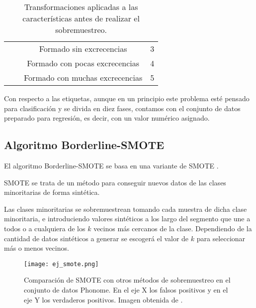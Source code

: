 \begin{table}[H]
{\begin{tabular}{|c|c|c|c|}
                                                      &                            & Formado sin excrecencias        & 3                                \\ \cline{3-4}
                                                      &                            & Formado con pocas excrecencias  & 4                                \\ \cline{3-4}
                                                      &                            & Formado con muchas excrecencias & 5                                \\ \hline
\end{tabular}%
}
\caption{Transformaciones aplicadas a las características antes de realizar el sobremuestreo.}\label{table:transformaciones_numericas}

\end{table}

Con respecto a las etiquetas, aunque en un principio este problema esté pensado para clasificación y se divida en diez fases, contamos con el conjunto de datos preparado para regresión, es decir, con un valor numérico asignado.


\subsection{Algoritmo Borderline-SMOTE}

El algoritmo Borderline-SMOTE \cite{BL-SMOTE} se basa en una variante de SMOTE \cite{SMOTE}.

SMOTE se trata de un método para conseguir nuevos datos de las clases minoritarias de forma sintética.

Las clases minoritarias se sobremuestrean tomando cada muestra de dicha clase minoritaria, e introduciendo valores sintéticos a los largo del segmento que une a todos o a cualquiera de los $k$ vecinos más cercanos de la clase. Dependiendo de la cantidad de datos sintéticos a generar se escogerá el valor de $k$ para seleccionar más o menos vecinos.


\begin{figure}[H]
	\centering
	\texttt{[image: ej\_smote.png]}
	\caption{Comparación de SMOTE con otros métodos de sobremuestreo en el conjunto de datos Phonome. En el eje X los falsos positivos y en el eje Y los verdaderos positivos. Imagen obtenida de \cite{SMOTE}.}
	\label{fig:comparacionSMOTE}
\end{figure}

